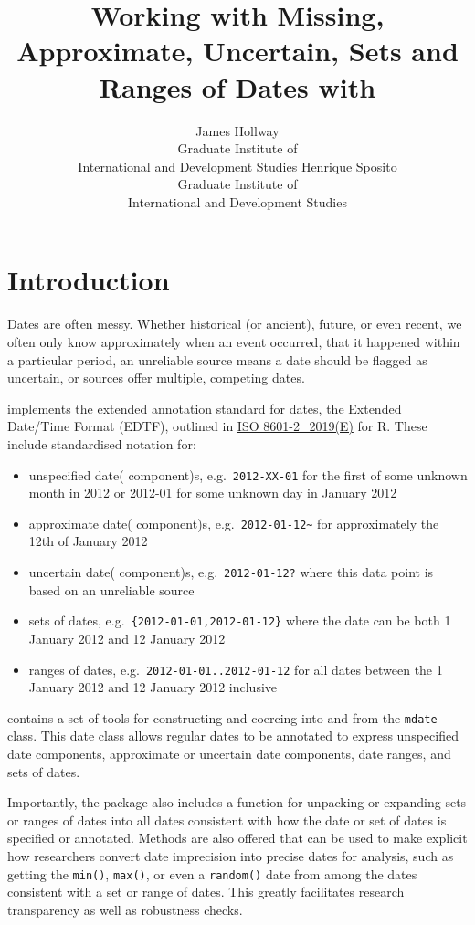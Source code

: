 \documentclass[
]{jss}
\author{
James Hollway\\Graduate Institute of\\
International and Development Studies \And Henrique Sposito\\Graduate
Institute of\\
International and Development Studies
}
\title{Working with Missing, Approximate, Uncertain, Sets and Ranges of
Dates with \pkg{messydates}}
\providecommand{\tightlist}{%
  \setlength{\itemsep}{0pt}\setlength{\parskip}{0pt}}
\begin{document}
\hypertarget{introduction}{%
\section{Introduction}\label{introduction}}

Dates are often messy. Whether historical (or ancient), future, or even
recent, we often only know approximately when an event occurred, that it
happened within a particular period, an unreliable source means a date
should be flagged as uncertain, or sources offer multiple, competing
dates.

 implements the extended annotation standard for dates,
the Extended Date/Time Format (EDTF), outlined in
\href{https://www.iso.org/standard/70908.html}{ISO 8601-2\_2019(E)} for
R. These include standardised notation for:

\begin{itemize}
\tightlist
\item
  unspecified date( component)s, e.g.~\texttt{2012-XX-01} for the first
  of some unknown month in 2012 or 2012-01 for some unknown day in
  January 2012
\item
  approximate date( component)s,
  e.g.~\texttt{2012-01-12\textasciitilde{}} for approximately the 12th
  of January 2012
\item
  uncertain date( component)s, e.g.~\texttt{2012-01-12?} where this data
  point is based on an unreliable source
\item
  sets of dates, e.g.~\texttt{\{2012-01-01,2012-01-12\}} where the date
  can be both 1 January 2012 and 12 January 2012
\item
  ranges of dates, e.g.~\texttt{2012-01-01..2012-01-12} for all dates
  between the 1 January 2012 and 12 January 2012 inclusive
\end{itemize}

 contains a set of tools for constructing and coercing
into and from the \texttt{mdate} class. This date class allows regular
dates to be annotated to express unspecified date components,
approximate or uncertain date components, date ranges, and sets of
dates.

Importantly, the package also includes a function for unpacking or
expanding sets or ranges of dates into all dates consistent with how the
date or set of dates is specified or annotated. Methods are also offered
that can be used to make explicit how researchers convert date
imprecision into precise dates for analysis, such as getting the
\texttt{min()}, \texttt{max()}, or even a \texttt{random()} date from
among the dates consistent with a set or range of dates. This greatly
facilitates research transparency as well as robustness checks.
\end{document}
